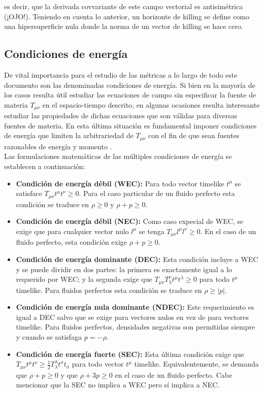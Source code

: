 \documentclass{article}
\numberwithin{equation}{section}
\begin{document}
es decir, que la derivada covvariante de este campo vectorial es antisimétrica (¡OJO!). Teniendo en cuenta lo anterior, un horizonte de killing se define como una hipersuperficie nula donde la norma de un vector de killing se hace cero.

\subsection{Condiciones de energía}

De vital importancia para el estudio de las métricas a lo largo de todo este documento son las denominadas condiciones de energía. Si bien en la mayoría de los casos resulta útil estudiar las ecuaciones de campo sin especificar la fuente de materia $T_{\mu \nu}$ en el espacio-tiempo descrito, en algunas ocasiones resulta interesante estudiar las propiedades de dichas ecuaciones que son válidas para diversas fuentes de materia. En esta última situación es fundamental imponer condiciones de energía que limiten la arbitrariedad de $T_{\mu \nu}$ con el fin de que sean fuentes razonables de energía y momento \cite{carroll}.\\

Las formulaciones matemáticas de las múltiples  condiciones de energía se establecen a continuación:

\begin{itemize}
\item \textbf{Condición de energía débil (WEC):} Para todo vector timelike $t^\mu$ se satisface $T_{\mu \nu}t^{\mu}t^{\nu} \geq 0$. Para el caso particular de un fluido perfecto esta condición se traduce en $\rho \geq 0$ y $\rho + p \geq 0$.

\item \textbf{Condición de energía débil (NEC):} Como caso expecial de WEC, se exige que para cualquier vector nulo $l^\mu$ se tenga $T_{\mu \nu}l^{\mu}l^{\nu} \geq 0$. En el caso de un fluido perfecto, esta condición exige $\rho + p \geq 0$.

\item \textbf{Condición de energía dominante (DEC):} Esta condición incluye a WEC y se puede dividir en dos partes: la primera es exactamente igual a lo requerido por WEC; y la segunda exige que $T_{\mu \nu}T^{\nu}_{\lambda}t^{\mu}t^{\lambda} \geq 0$ para todo $t^{\mu}$ timelike. Para fluidos perfectos esta condición se traduce en $\rho \geq |p|$.

\item \textbf{Condición de energía nula dominante (NDEC):} Este requerimiento es igual a DEC salvo que se exige para vectores nulos en vez de para vectores timelike. Para fluidos perfectos, densidades negativas son permitidas siempre y cuando se satisfaga $p = -\rho$.

\item \textbf{Condición de energía fuerte (SEC):} Esta última condición exige que $T_{\mu \nu}t^{\mu}t^{\nu} \geq \frac{1}{2}T^{\lambda}_{\lambda}t^{\sigma}t_{\sigma}$ para todo vector $t^\mu$ timelike. Equivalentemente, se demanda que $\rho + p \geq 0$ y que $\rho + 3p \geq 0$ en el caso de un fluido perfecto. Cabe mencionar que la SEC no implica a WEC pero sí implica a NEC.
\end{itemize}
\end{document}
